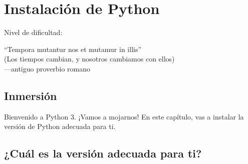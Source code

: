 
\chapter{Instalación de Python}\label{ch:instalacion}

\noindent
Nivel de dificultad:\difl

\begin{citaCap}
``Tempora mutantur nos et mutamur in illis''\\
(Los tiempos cambian, y nosotros cambiamos con ellos)\\
---antiguo proverbio romano
\end{citaCap}

\section{Inmersión}

Bienvenido a Python 3. ¡Vamos a mojarnos! En este capítulo, vas a instalar la versión de Python adecuada para ti.

\section{¿Cuál es la versión adecuada para ti?}

